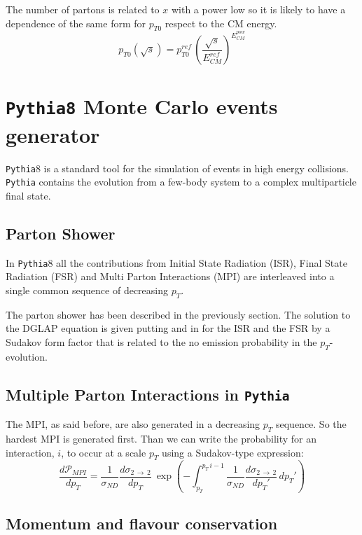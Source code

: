 The number of partons is related to $x$ with a power low so it is likely to have a dependence of the same form for $p_{T0}$ respect to the CM energy.
\begin{equation}
	p_{T0}(\sqrt{s})=p_{T0}^{ref} \,\left( \frac{\sqrt{s}}{E_{CM}^{ref}} \right)^{E_{CM}^{pow}}
\end{equation}
	
\section{\texttt{Pythia8} Monte Carlo events generator}	

\texttt{Pythia}8 is a standard tool for the simulation of events in high energy collisions. \texttt{Pythia} contains the evolution from a few-body system to a complex multiparticle final state.

\subsection{Parton Shower}

 In \texttt{Pythia}8 all the contributions from Initial State Radiation (ISR), Final State Radiation (FSR) and Multi Parton Interactions (MPI) are interleaved into a single common sequence of decreasing $p_T$. 

The parton shower has been described in the previously section. The solution to the DGLAP equation is given putting  and  in  for the ISR and the FSR by a Sudakov form factor that is related to the no emission probability in the $p_T$-evolution. 

\subsection{Multiple Parton Interactions in \texttt{Pythia}}

The MPI, as said before, are also generated in a decreasing $p_T$ sequence. So the hardest MPI is generated first. Than we can write the probability for an interaction, $i$, to occur at a scale $p_T$ using a Sudakov-type expression:
\begin{equation}
	\frac{d\mathcal{P}_{MPI}}{dp_T}=\frac{1}{\sigma_{ND}}\frac{d\sigma_{2\,\rightarrow\,2}}{dp_T}\ \exp\left( -\displaystyle\int_{p_T}^{p_T\,i-1} \frac{1}{\sigma_{ND}}\frac{d\sigma_{2\,\rightarrow\,2}}{dp_T'}\,dp_T' \right)
\end{equation}

\subsection{Momentum and flavour conservation}

